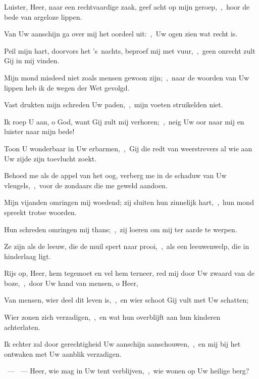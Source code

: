 \documentclass[12pt,twoside,a5paper]{article}
\begin{document}
\begin{halfparskip}
   Luister, Heer, naar een rechtvaardige zaak, geef acht op mijn geroep,~\sep\ hoor de bede van argeloze lippen.

  Van Uw aanschijn ga over mij het oordeel uit:~\sep\ Uw ogen zien wat recht is.

  Peil mijn hart, doorvors het 's~nachts, beproef mij met vuur,~\sep\ geen onrecht zult Gij in mij vinden.

  Mijn mond misdeed niet zoals mensen gewoon zijn;~\sep\ naar de woorden van Uw lippen heb ik de wegen der Wet gevolgd.

  Vast drukten mijn schreden Uw paden,~\sep\ mijn voeten struikelden niet.

  Ik roep U aan, o God, want Gij zult mij verhoren;~\sep\ neig Uw oor naar mij en luister naar mijn bede!

  Toon U wonderbaar in Uw erbarmen,~\sep\ Gij die redt van weerstrevers al wie aan Uw zijde zijn toevlucht zoekt.

  Behoed me als de appel van het oog, verberg me in de schaduw van Uw vleugels,~\sep\ voor de zondaars die me geweld aandoen.

  Mijn vijanden omringen mij woedend; zij sluiten hun zinnelijk hart,~\sep\ hun mond spreekt trotse woorden.

  Hun schreden omringen mij thans;~\sep\ zij loeren om mij ter aarde te werpen.

  Ze zijn als de leeuw, die de muil spert naar prooi,~\sep\ als een leeuwenwelp, die in hinderlaag ligt.

  Rijs op, Heer, hem tegemoet en vel hem terneer, red mij door Uw zwaard van de boze,~\sep\ door Uw hand van mensen, o Heer,

  Van mensen, wier deel dit leven is,~\sep\ en wier schoot Gij vult met Uw schatten;

  Wier zonen zich verzadigen,~\sep\ en wat hun overblijft aan hun kinderen achterlaten.

  Ik echter zal door gerechtigheid Uw aanschijn aanschouwen,~\sep\ en mij bij het ontwaken met Uw aanblik verzadigen.
\end{halfparskip}

\begin{halfparskip}
  ~--- ~---  Heer, wie mag in Uw tent verblijven,~\sep\ wie wonen op Uw heilige berg?
\end{halfparskip}
\end{document}
